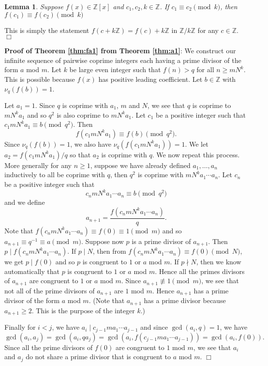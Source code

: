 \documentclass{article}
\def\Z{{\mathbb Z}}
\def\Z{{\mathbb Z}}
\newtheorem{lemma}[subsection]{Lemma}
\newenvironment{proof}{\noindent {\bf Proof:}}{$\Box$ \vspace{2 ex}}
\begin{document}
\begin{lemma}
    Suppose $f(x)\in\Z[x]$ and $c_1,c_2,k\in\Z$. If $c_1\equiv c_2\pmod{k}$, then $f(c_1)\equiv f(c_2)\pmod{k}$
\end{lemma}

\begin{proof}
    This is simply the statement $f(c + k\Z) = f(c) + k\Z$ in $\Z/k\Z$ for any $c\in\Z$.
\end{proof}

\vspace{5pt}
\noindent\textbf{Proof of Theorem \ref{thm:fa1} from Theorem \ref{thm:a1}}: We construct our infinite sequence of pairwise coprime integers each having a prime divisor of the form $a$ mod $m$. Let $k$ be large even integer such that $f(n) > q$ for all $n \geq mN^k$. This is possible because $f(x)$ has positive leading coefficient. Let $b\in\Z$ with $\nu_q(f(b)) = 1$.

Let $a_1 = 1$. Since $q$ is coprime with $a_1$, $m$ and $N$, we see that $q$ is coprime to $mN^ka_1$ and so $q^2$ is also coprime to $mN^ka_1$. Let $c_1$ be a positive integer such that $c_1mN^ka_1\equiv b\pmod{q^2}$. Then $$f(c_1mN^ka_1)\equiv f(b)\pmod{q^2}.$$ Since $\nu_q(f(b)) = 1$, we also have $\nu_q(f(c_1mN^ka_1)) = 1$. We let $a_2 = f(c_1mN^ka_1)/q$ so that $a_2$ is coprime with $q$. We now repeat this process. More generally for any $n\geq 1$, suppose we have already defined $a_1,\ldots,a_n$ inductively to all be coprime with $q$, then $q^2$ is coprime with $mN^ka_1\cdots a_n$. Let $c_n$ be a positive integer such that $$c_nmN^ka_1\cdots a_n\equiv b\pmod{q^2}$$ and we define $$a_{n+1} = \frac{f(c_nmN^ka_1\cdots a_n)}{q}.$$
Note that $f(c_nmN^ka_1\cdots a_n)\equiv f(0)\equiv 1\pmod{m}$ and so $a_{n+1}\equiv q^{-1} \equiv a\pmod{m}$. Suppose now $p$ is a prime divisor of $a_{n+1}$. Then $p\mid f(c_nmN^ka_1\cdots a_n)$. If $p\mid N$, then from $f(c_nmN^ka_1\cdots a_n)\equiv f(0)\pmod{N}$, we get $p\mid f(0)$ and so $p$ is congruent to $1$ or $a$ mod $m$. If $p\nmid N$, then we know automatically that $p$ is congruent to $1$ or $a$ mod $m$. Hence all the primes divisors of $a_{n+1}$ are congruent to $1$ or $a$ mod $m$. Since $a_{n+1}\not\equiv 1\pmod{m}$, we see that not all of the prime divisors of $a_{n+1}$ are $1$ mod $m$. Hence $a_{n+1}$ has a prime divisor of the form $a$ mod $m$. (Note that $a_{n+1}$ has a prime divisor because $a_{n+1}\geq 2$. This is the purpose of the integer $k$.)

Finally for $i < j$, we have $a_i\mid c_{j-1}ma_1\cdots a_{j-1}$ and since $\gcd(a_i,q) = 1$, we have 
$$\gcd(a_i,a_j) = \gcd(a_i,qa_j) = \gcd(a_i,f(c_{j-1}ma_1\cdots a_{j-1})) = \gcd(a_i,f(0)).$$
Since all the prime divisors of $f(0)$ are congruent to $1$ mod $m$, we see that $a_i$ and $a_j$ do not share a prime divisor that is congruent to $a$ mod $m$.
$\Box$
\end{document}
